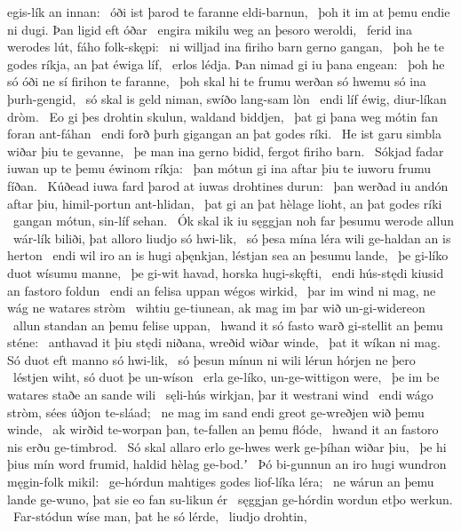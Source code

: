 egis-lík an innan: \hld\ óði ist þarod te faranne
eldi-barnun, \hld\ þoh it im at þemu endie ni dugi.
Þan ligid eft óðar \hld\ engira mikilu
weg an þesoro weroldi, \hld\ ferid ina werodes lút,
fáho folk-skępi: \hld\ ni willjad ina firiho barn
gerno gangan, \hld\ þoh he te godes ríkja,
an þat éwiga líf, \hld\ erlos lédja.
Þan nimad gi iu þana engean: \hld\ þoh he só óði ne sí
firihon te faranne, \hld\ þoh skal hi te frumu werðan
só hwemu só ina þurh-gengid, \hld\ só skal is geld niman,
swíðo lang-sam lòn \hld\ endi líf éwig,
diur-líkan dròm. \hld\ Eo gi þes drohtin skulun,
waldand biddjen, \hld\ þat gi þana weg mótin
fan foran ant-fáhan \hld\ endi forð þurh gigangan
an þat godes ríki. \hld\ He ist garu simbla
wiðar þiu te gevanne, \hld\ þe man ina gerno bidid,
fergot firiho barn. \hld\ Sókjad fadar iuwan
up te þemu éwinom ríkja: \hld\ þan mótun gi ina aftar þiu
te iuworu frumu fíðan. \hld\ Kúðead iuwa fard þarod
at iuwas drohtines durun: \hld\ þan werðad iu andón aftar þiu,
himil-portun ant-hlidan, \hld\ þat gi an þat hèlage lioht,
an þat godes ríki \hld\ gangan mótun,
sin-líf sehan. \hld\ Ók skal ik iu sęggjan noh
far þesumu werode allun \hld\ wár-lík biliði,
þat alloro liudjo só hwi-lik, \hld\ só þesa mína léra wili
ge-haldan an is herton \hld\ endi wil iro an is hugi aþęnkjan,
léstjan sea an þesumu lande, \hld\ þe gi-líko duot
wísumu manne, \hld\ þe gi-wit havad,
horska hugi-skęfti, \hld\ endi hús-stędi kiusid
an fastoro foldun \hld\ endi an felisa uppan
wégos wirkid, \hld\ þar im wind ni mag,
ne wág ne watares stròm \hld\ wihtiu ge-tiunean,
ak mag im þar wið un-gi-widereon \hld\ allun standan
an þemu felise uppan, \hld\ hwand it só fasto warð
gi-stellit an þemu sténe: \hld\ anthavad it þiu stędi niðana,
wreðid wiðar winde, \hld\ þat it wíkan ni mag.
Só duot eft manno só hwi-lik, \hld\ só þesun mínun ni wili
lérun hórjen ne þero \hld\ léstjen wiht,
só duot þe un-wíson \hld\ erla ge-líko,
un-ge-wittigon were, \hld\ þe im be watares staðe
an sande wili \hld\ sęli-hús wirkjan,
þar it westrani wind \hld\ endi wágo stròm,
sées úðjon te-sláad; \hld\ ne mag im sand endi greot
ge-wreðjen wið þemu winde, \hld\ ak wirðid te-worpan þan,
te-fallen an þemu flóde, \hld\ hwand it an fastoro nis
erðu ge-timbrod. \hld\ Só skal allaro erlo ge-hwes
werk ge-þíhan wiðar þiu, \hld\ þe hi þius mín word frumid,
haldid hèlag ge-bod.ʼ \hld\ Þó bi-gunnun an iro hugi wundron
męgin-folk mikil: \hld\ ge-hórdun mahtiges godes
liof-líka léra; \hld\ ne wárun an þemu lande ge-wuno,
þat sie eo fan su-likun ér \hld\ sęggjan ge-hórdin
wordun etþo werkun. \hld\ Far-stódun wíse man,
þat he só lérde, \hld\ liudjo drohtin,
